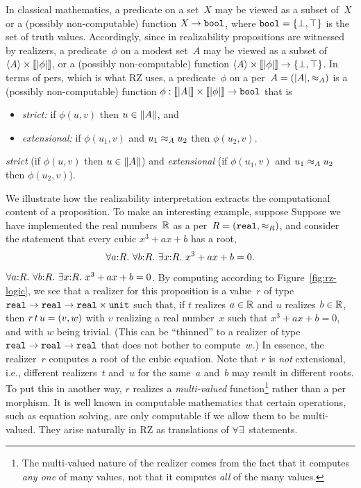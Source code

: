 In classical mathematics, a predicate on a set~$X$ may be viewed as a
subset of~$X$ or a (possibly non-computable) function $X \to \mathtt{bool}$,
where $\mathtt{bool} = \{\bot, \top\}$ is the set of truth values.
Accordingly, since in realizability propositions are witnessed by
realizers,
%
\iflong
a predicate~$\phi$ on a modest set~$A$ may be viewed as a
subset of $\langle A \rangle \times [\![|\phi|]\!]$, or a (possibly
non-computable) function $\langle A \rangle \times [\![|\phi|]\!] \to
\{\bot, \top\}$. In terms of pers, which is what RZ uses,
\fi
%
a predicate~$\phi$ on a per~$A = (|A|, {\approx_A})$ is a
(possibly non-computable) function $\phi : [\![|A|]\!] \times
[\![|\phi|]\!] \to \mathtt{bool}$ that is
%
\iflong
\begin{itemize}
\item \emph{strict:} if $\phi(u,v)$ then $u \in \|A\|$, and
\item \emph{extensional:} if $\phi(u_1,v)$ and $u_1 \approx_A u_2$ then
  $\phi(u_2,v)$.
\end{itemize}
\else %
\emph{strict} (if $\phi(u,v)$ then $u \in \|A\|$) 
and \emph{extensional} (if $\phi(u_1,v)$ and $u_1 \approx_A u_2$ then
  $\phi(u_2,v)$).
\fi

\iflong
We illustrate how the realizability interpretation extracts the
computational content of a proposition. To make an interesting
example, suppose
\else %
Suppose
\fi %
we have implemented the real
numbers~$\mathbb{R}$ as a per~$R = (\mathtt{real}, {\approx_R})$, and
consider  
\iflong
the statement
that every cubic $x^3 + a x + b$ has a root,
%
\begin{equation}
  \label{eq:square-root}%
  \iforall{a}{R}{\iforall{b}{R}{\iexists{x}{R}{\iequal{x^3 + a x + b}{0}}}}.
\end{equation}
\else %
$\forall a{:}R.\ \forall b{:}R.\ \exists x{:}R.\ x^3 + a x + b = 0$.
\fi %
%
By computing according to Figure~\ref{fig:rz-logic}, we see that
a realizer for this proposition is a value~$r$ of type
$\mathtt{real} \to \mathtt{real} \to \mathtt{real} \times \mathtt{unit}$
such that, if $t$ realizes $a \in \mathbb{R}$ and $u$ realizes $b \in
\mathbb{R}$, then $r\,t\,u = (v, w)$ with $v$ realizing a real
number~$x$ such that $x^3 + a x + b = 0$, and with $w$ being trivial. (This
can be ``thinned'' to a realizer of type
$\mathtt{real} \to \mathtt{real} \to \mathtt{real}$ that
does not bother to compute~$w$.) In essence, the realizer~$r$
computes a root of the cubic equation. Note
that $r$ is \emph{not} extensional, i.e., different realizers~$t$
and~$u$ for the same~$a$ and~$b$ may result in different roots. 
To put this in another way, $r$ realizes a \emph{multi-valued}
function\footnote{The multi-valued nature of the realizer comes from
  the fact that it computes \emph{any one} of many values, not that it
  computes \emph{all} of the many values.} rather than a per
morphism. It is well known in computable mathematics that certain
operations, such as equation solving, are only computable if we allow
them to be multi-valued. They arise naturally in RZ as translations of
$\forall\exists$~statements.

